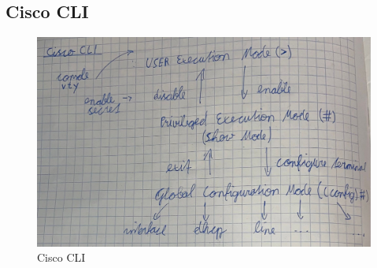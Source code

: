 \subsection*{Cisco CLI}
\begin{figure}[H]
	\centering
	\includegraphics[width=0.9\linewidth]{figures/ciscocli.jpeg}
	\caption{Cisco CLI}
\end{figure}
